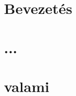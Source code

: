 \documentclass[12pt,a4paper]{report}
\begin{document}
\chapter{Bevezetés} \label{ch:bev}
\setcounter{page}{1} 

\chapter{...}
















\appendix

\chapter{valami}
\end{document}
